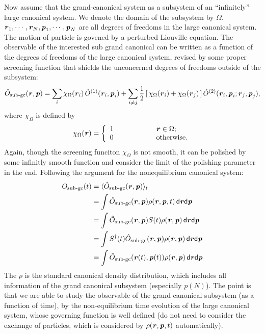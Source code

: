 \documentclass[aps,pre,preprint,unsortedaddress]{revtex4}
\renewcommand{\v}[1]{\textbf{\textit{#1}}}
\renewcommand{\d}[1]{\textsf{#1}}
\begin{document}
Now assume that the grand-canonical system as a subsystem of an
``infinitely'' large canonical system. We denote the domain of the
subsystem by $\Omega$. $\v r_1, \cdots, \v r_N, \v p_1, \cdots, \v
p_N$ are all degrees of freedoms in the large canonical system.  The
motion of particle is govened by a perturbed Liouville equation.  The
observable of the interested sub grand canonical can be written as a
function of the degrees of freedoms of the large canonical system,
revised by some proper screening function that shields the unconcerned
degrees of freedoms outside of the subsystem:
\begin{align}
  \hat O_{\textrm{sub-gc}}(\v r, \v p) =
  \sum_i
  \chi_\Omega(\v r_i)\,\hat O^{(1)}(\v r_i, \v p_i) +
  \sum_{i\neq j}
  \frac12 \,[\,
  \chi_\Omega(\v r_i) + \chi_\Omega(\v r_j)
  \,]\,
  \hat O^{(2)}(\v r_i, \v p_i; \v r_j, \v p_j),  
\end{align}
where $\chi_\Omega$ is defined by
\begin{align}
  \chi_\Omega(\v r)=
  \left\{
    \begin{array}{lcl}
      1 &\qquad\qquad& \v r \in \Omega; \\
      0 && \textrm{otherwise}.
    \end{array}
  \right.
\end{align}
Again, though the screening funciton $\chi_\Omega$ is not smooth, it
can be polished by some infinitly smooth function and consider the
limit of the polishing parameter in the end.  Following the argument
for the nonequilibrium canonical system:
\begin{align}\nonumber
  O_{\textrm{sub-gc}}(t)
  & = \langle \hat O_{\textrm{sub-gc}}(\v r, \v p)\rangle_t\\\nonumber
  & =
  \int
  \hat O_{\textrm{sub-gc}}(\v r, \v p) \rho(\v r, \v p, t)\,
  \d d\v r\d d\v p\\\nonumber
  & =
  \int
  \hat O_{\textrm{sub-gc}}(\v r, \v p) S(t)\rho(\v r, \v p)\,
  \d d\v r\d d\v p\\\nonumber
  & =
  \int
  S^{\dagger}(t)\hat O_{\textrm{sub-gc}}(\v r, \v p) \rho(\v r, \v p)\,
  \d d\v r\d d\v p\\
  & =
  \int
  \hat O_{\textrm{sub-gc}}(\v r(t), \v p(t)) \rho(\v r, \v p)\,
  \d d\v r\d d\v p
\end{align}
The $\rho$ is the standard canonical density distribution, which
includes all information of the grand canonical subsystem (especially
$p(N)$). The point is that we are able to study the observable of the
grand canonical subsystem (as a function of time), by the
non-equilibrium time evolution of the large canonical system, whose
governing function is well defined (do not need to consider the
exchange of particles, which is considered by $\rho(\v r, \v p, t)$
automatically).





{}

\end{document}
